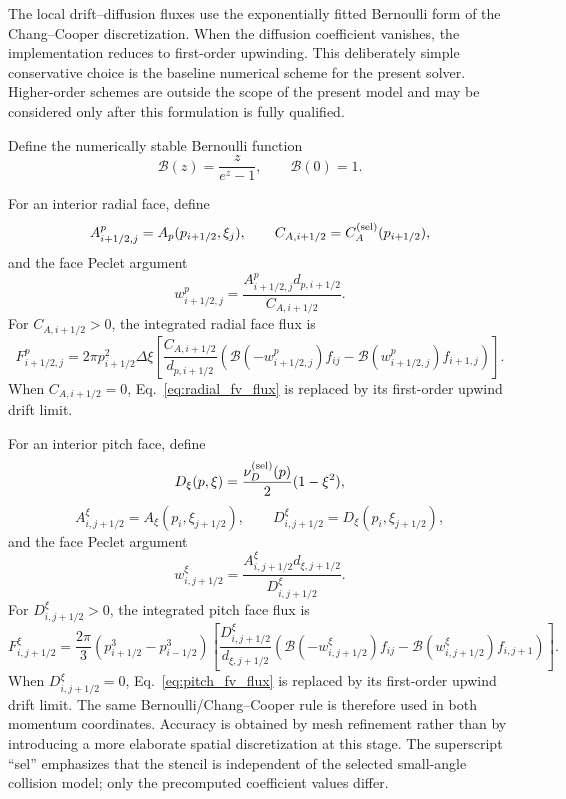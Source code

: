 \documentclass[11pt]{article}
\begin{document}
The local drift--diffusion fluxes use the exponentially fitted Bernoulli form of the
Chang--Cooper discretization.  When the diffusion coefficient vanishes, the implementation
reduces to first-order upwinding.  This deliberately simple conservative choice is the
baseline numerical scheme for the present solver.  Higher-order schemes are outside the
scope of the present model and may be considered only after this formulation is fully
qualified.

Define the numerically stable Bernoulli function
\begin{equation}
 \mathcal B(z)=\frac{z}{e^z-1},\qquad \mathcal B(0)=1.
 \label{eq:bernoulli_function}
\end{equation}

For an interior radial face, define
\begin{equation}
 A^p_{i+1/2,j}=A_p(p_{i+1/2},\xi_j),\qquad
 C_{A,i+1/2}=C_A^{({\rm sel})}(p_{i+1/2}),
\end{equation}
and the face Peclet argument
\begin{equation}
 w^p_{i+1/2,j}=\frac{A^p_{i+1/2,j}d_{p,i+1/2}}{C_{A,i+1/2}}.
 \label{eq:radial_peclet}
\end{equation}
For $C_{A,i+1/2}>0$, the integrated radial face flux is
\begin{equation}
 F^p_{i+1/2,j}
 =2\pi p_{i+1/2}^2\Delta\xi
 \left[
   \frac{C_{A,i+1/2}}{d_{p,i+1/2}}
 \left(
   \mathcal B(-w^p_{i+1/2,j})f_{ij}
  -\mathcal B(w^p_{i+1/2,j})f_{i+1,j}
 \right)
 \right].
 \label{eq:radial_fv_flux}
\end{equation}
When $C_{A,i+1/2}=0$, Eq.~\eqref{eq:radial_fv_flux} is replaced by its first-order
upwind drift limit.

For an interior pitch face, define
\begin{equation}
 D_\xi(p,\xi)=\frac{\nu_D^{({\rm sel})}(p)}{2}(1-\xi^2),
\end{equation}
\begin{equation}
 A^\xi_{i,j+1/2}=A_\xi(p_i,\xi_{j+1/2}),\qquad
 D^\xi_{i,j+1/2}=D_\xi(p_i,\xi_{j+1/2}),
\end{equation}
and the face Peclet argument
\begin{equation}
 w^\xi_{i,j+1/2}=\frac{A^\xi_{i,j+1/2}d_{\xi,j+1/2}}{D^\xi_{i,j+1/2}}.
 \label{eq:pitch_peclet}
\end{equation}
For $D^\xi_{i,j+1/2}>0$, the integrated pitch face flux is
\begin{equation}
 F^\xi_{i,j+1/2}
 =\frac{2\pi}{3}
  \left(p_{i+1/2}^3-p_{i-1/2}^3\right)
 \left[
  \frac{D^\xi_{i,j+1/2}}{d_{\xi,j+1/2}}
 \left(
   \mathcal B(-w^\xi_{i,j+1/2})f_{ij}
  -\mathcal B(w^\xi_{i,j+1/2})f_{i,j+1}
 \right)
 \right].
 \label{eq:pitch_fv_flux}
\end{equation}
When $D^\xi_{i,j+1/2}=0$, Eq.~\eqref{eq:pitch_fv_flux} is replaced by its first-order
upwind drift limit.  The same Bernoulli/Chang--Cooper rule is therefore used in both
momentum coordinates.  Accuracy is obtained by mesh refinement rather than by
introducing a more elaborate spatial discretization at this stage.
The superscript ``sel'' emphasizes that the stencil is independent of the selected
small-angle collision model; only the precomputed coefficient values differ.
\end{document}
